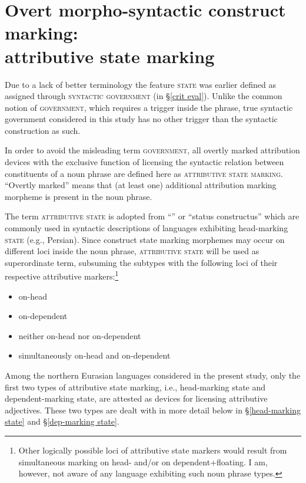 \section[Attributive state marking]{Overt morpho-syntactic construct marking:\\attributive state marking}

Due to a lack of better terminology the feature \textsc{state} was earlier defined as assigned through \textsc{syntactic government} (in \S\ref{crit eval}). Unlike the common notion of \textsc{government}, which requires a trigger inside the phrase, true syntactic government considered in this study has no other trigger than the syntactic construction as such.

In order to avoid the misleading term \textsc{government}, all overtly marked attribution devices with the exclusive function of licensing the syntactic relation between constituents of a noun phrase are defined here as \textsc{attributive state marking}. “Overtly marked” means that (at least one) additional attribution marking morpheme is present in the noun phrase.

The term \textsc{attributive state} is adopted from “” or “status constructus” which are commonly used in syntactic descriptions of languages exhibiting head-marking \textsc{state} (e.g., Persian). Since construct state marking morphemes may occur on different loci inside the noun phrase, \textsc{attributive state} will be used as superordinate term, subsuming the subtypes with the following loci of their respective attributive markers:\footnote{Other logically possible loci of attributive state markers would result from simultaneous marking on head- and\slash{}or on dependent+floating. I am, however, not aware of any language exhibiting such noun phrase types.}
\begin{itemize}
\settowidth{}
\item on-head 								
\item on-dependent 							
\item neither on-head nor on-dependent 			
\item simultaneously on-head and on-dependent 	
\end{itemize}
Among the northern Eurasian languages considered in the present study, only the first two types of attributive state marking, i.e., head-marking state and dependent\hyp{}marking state, are attested as devices for licensing attributive adjectives. These two types are dealt with in more detail below in \S\ref{head-marking state} and \S\ref{dep-marking state}.

